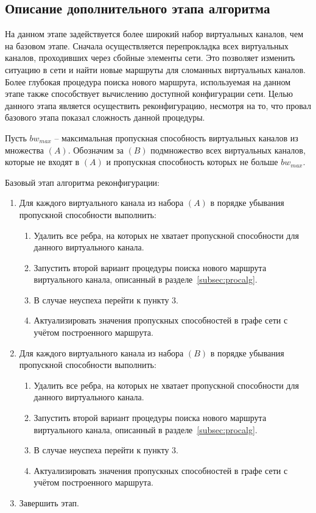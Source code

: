 \documentclass[12pt, a4paper]{article}
\begin{document}
\subsection{Описание дополнительного этапа алгоритма}
На данном этапе задействуется более широкий набор виртуальных каналов, чем на базовом этапе. Сначала осуществляется перепрокладка всех виртуальных каналов, проходивших через сбойные элементы сети. Это позволяет изменить ситуацию в сети и найти новые маршруты для сломанных виртуальных каналов. Более глубокая процедура поиска нового маршрута, используемая на данном этапе также способствует вычислению доступной конфигурации сети. Целью данного этапа является осуществить реконфигурацию, несмотря на то, что провал базового этапа показал сложность данной процедуры.

Пусть $bw_{max}$ -- максимальная пропускная способность виртуальных каналов из множества $(A)$.
Обозначим за $(B)$ подмножество всех виртуальных каналов, которые не входят в $(A)$ и пропускная способность которых не больше $bw_{max}$.

Базовый этап алгоритма реконфигурации:
\begin{enumerate}
	\item Для каждого виртуального канала из набора $(A)$ в порядке убывания пропускной способности выполнить:
	\begin{enumerate}
		\item Удалить все ребра, на которых не хватает пропускной способности для данного виртуального канала.
		\item Запустить второй вариант процедуры поиска нового маршрута виртуального канала, описанный в разделе~\ref{subsec:procalg}.
		\item В случае неуспеха перейти к пункту 3.
		\item Актуализировать значения пропускных способностей в графе сети с учётом построенного маршрута.
	\end{enumerate}
	\item Для каждого виртуального канала из набора $(B)$ в порядке убывания пропускной способности выполнить:
	\begin{enumerate}
		\item Удалить все ребра, на которых не хватает пропускной способности для данного виртуального канала.
		\item Запустить второй вариант процедуры поиска нового маршрута виртуального канала, описанный в разделе~\ref{subsec:procalg}.
		\item В случае неуспеха перейти к пункту 3.
		\item Актуализировать значения пропускных способностей в графе сети с учётом построенного маршрута.
	\end{enumerate}
	\item Завершить этап.
\end{enumerate}
\end{document}
